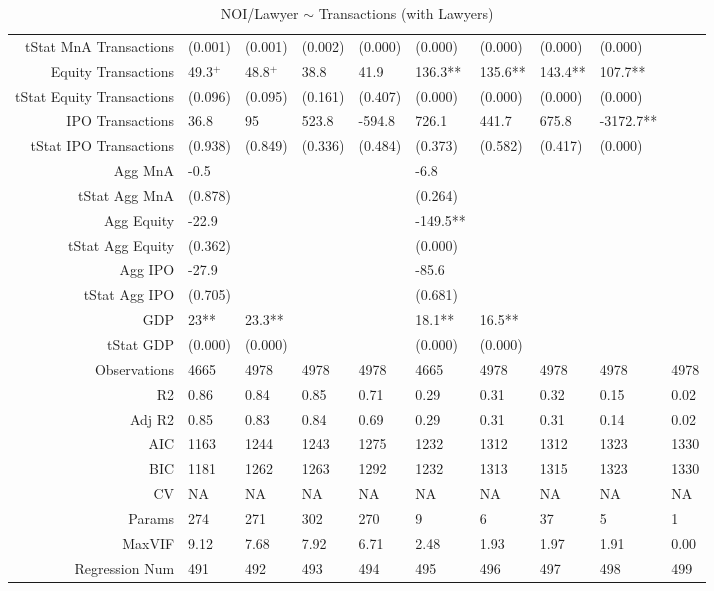 \begin{table}[ht]
\begin{tabular}{rlllllllll}
  tStat MnA Transactions & (0.001) & (0.001) & (0.002) & (0.000) & (0.000) & (0.000) & (0.000) & (0.000) &  \\ 
  Equity Transactions & 49.3$^{+}$ & 48.8$^{+}$ & 38.8 & 41.9 & 136.3** & 135.6** & 143.4** & 107.7** &  \\ 
  tStat Equity Transactions & (0.096) & (0.095) & (0.161) & (0.407) & (0.000) & (0.000) & (0.000) & (0.000) &  \\ 
  IPO Transactions & 36.8 & 95 & 523.8 & -594.8 & 726.1 & 441.7 & 675.8 & -3172.7** &  \\ 
  tStat IPO Transactions & (0.938) & (0.849) & (0.336) & (0.484) & (0.373) & (0.582) & (0.417) & (0.000) &  \\ 
  Agg MnA & -0.5 &  &  &  & -6.8 &  &  &  &  \\ 
  tStat Agg MnA & (0.878) &  &  &  & (0.264) &  &  &  &  \\ 
  Agg Equity & -22.9 &  &  &  & -149.5** &  &  &  &  \\ 
  tStat Agg Equity & (0.362) &  &  &  & (0.000) &  &  &  &  \\ 
  Agg IPO & -27.9 &  &  &  & -85.6 &  &  &  &  \\ 
  tStat Agg IPO & (0.705) &  &  &  & (0.681) &  &  &  &  \\ 
  GDP & 23** & 23.3** &  &  & 18.1** & 16.5** &  &  &  \\ 
  tStat GDP & (0.000) & (0.000) &  &  & (0.000) & (0.000) &  &  &  \\ 
  Observations & 4665 & 4978 & 4978 & 4978 & 4665 & 4978 & 4978 & 4978 & 4978 \\ 
  R2 & 0.86 & 0.84 & 0.85 & 0.71 & 0.29 & 0.31 & 0.32 & 0.15 & 0.02 \\ 
  Adj R2 & 0.85 & 0.83 & 0.84 & 0.69 & 0.29 & 0.31 & 0.31 & 0.14 & 0.02 \\ 
  AIC & 1163 & 1244 & 1243 & 1275 & 1232 & 1312 & 1312 & 1323 & 1330 \\ 
  BIC & 1181 & 1262 & 1263 & 1292 & 1232 & 1313 & 1315 & 1323 & 1330 \\ 
  CV & NA & NA & NA & NA & NA & NA & NA & NA & NA \\ 
  Params & 274 & 271 & 302 & 270 & 9 & 6 & 37 & 5 & 1 \\ 
  MaxVIF & 9.12 & 7.68 & 7.92 & 6.71 & 2.48 & 1.93 & 1.97 & 1.91 & 0.00 \\ 
  Regression Num & 491 & 492 & 493 & 494 & 495 & 496 & 497 & 498 & 499 \\ 
   \hline
\end{tabular}
\caption{NOI/Lawyer $\sim$ Transactions (with Lawyers)} 
\end{table}
